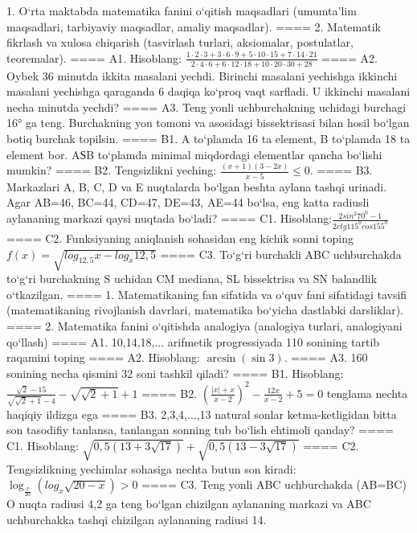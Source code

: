 1. O‘rta maktabda matematika fanini o‘qitish maqsadlari (umumta’lim maqsadlari, tarbiyaviy maqsadlar, amaliy maqsadlar).
====
2. Matematik fikrlash va xulosa chiqarish (tasvirlash turlari, aksiomalar, postulatlar, teoremalar).
====
A1. Hisoblang: \(\frac{1 \cdot 2 \cdot 3 + 3 \cdot 6 \cdot 9 + 5 \cdot 10 \cdot 15 + 7 \cdot 14 \cdot 21}{2 \cdot 4 \cdot 6 + 6 \cdot 12 \cdot 18 + 10 \cdot 20 \cdot 30 + 28}\)
====
A2. Oybek 36 minutda ikkita masalani yechdi. Birinchi masalani yechishga ikkinchi masalani yechishga qaraganda 6 daqiqa ko‘proq vaqt sarfladi. U ikkinchi masalani necha minutda yechdi?
====
A3. Teng yonli uchburchakning uchidagi burchagi 16° ga teng. Burchakning yon tomoni va asosidagi bissektrisasi bilan hosil bo‘lgan botiq burchak topilsin.
====
B1. A to‘plamda 16 ta element, B to‘plamda 18 ta element bor. AЅB to‘plamda minimal miqdordagi elementlar qancha bo‘lishi mumkin?
====
B2. Tengsizlikni yeching: \(\frac{ (x + 1) (3 - 2x) }{x - 5} \leq 0\).
====
B3. Markazlari A, B, C, D va E nuqtalarda bo‘lgan beshta aylana tashqi urinadi. Agar AB=46, BC=44, CD=47, DE=43, AE=44 bo‘lsa, eng katta radiusli aylananing markazi qaysi nuqtada bo‘ladi?
====
C1. Hisoblang:\(\frac{2sin^{2}70^{0} - 1}{2ctg115^{0}cos155^{0}}\)
====
C2. Funksiyaning aniqlanish sohasidan eng kichik sonni toping \(f (x) = \sqrt{log_{12,5}x - log_{x}12,5}\)
====
C3. To‘g‘ri burchakli ABC uchburchakda to‘g‘ri burchakning S uchidan CM mediana, SL bissektrisa va SN balandlik o‘tkazilgan.
====
1. Matematikaning fan sifatida va o‘quv fani sifatidagi tavsifi (matematikaning rivojlanish davrlari, matematika bo‘yicha dastlabki darsliklar).
====
2. Matematika fanini o‘qitishda analogiya (analogiya turlari, analogiyani qo‘llash)
====
A1. 10,14,18,... arifmetik progressiyada 110 sonining tartib raqamini toping
====
A2. Hisoblang: \(\arcsin (\sin3) \).
====
A3. 160 sonining necha qismini 32 soni tashkil qiladi?
====
B1. Hisoblang: \(\frac{\sqrt{2} - 15}{\sqrt{\sqrt{2} + 1} - 4} - \sqrt{\sqrt{2} + 1} + 1\)
====
B2. $ (\frac{|x| + x}{x-2}) ^{2} - \frac{12x}{x-2} + 5 = 0$ tenglama nechta haqiqiy ildizga ega
====
B3. 2,3,4,...,13 natural sonlar ketma-ketligidan bitta son tasodifiy tanlansa, tanlangan sonning tub bo‘lish ehtimoli qanday?
====
C1. Hisoblang: \(\sqrt{0,5 (13 + 3\sqrt{17}) } + \sqrt{0,5 (13 - 3\sqrt{17}) }\)
====
C2. Tengsizlikning yechimlar sohasiga nechta butun son kiradi: \(\log_{\frac{x}{20}} (log_{x}\sqrt{20 - x}) > 0\)
====
C3. Teng yonli ABC uchburchakda (AB=BC) O nuqta radiusi 4,2 ga teng bo‘lgan chizilgan aylananing markazi va ABC uchburchakka tashqi chizilgan aylananing radiusi 14.
